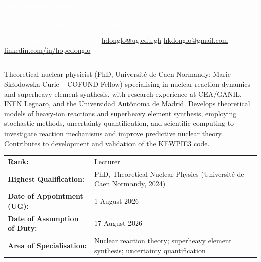 \documentclass[10pt,a4paper]{article}
\newcommand{\cvsection}[1]{%
  \par\vspace{8pt}%
  \noindent{\large\bfseries\textcolor{maincolor}{#1}}\par
  {\color{maincolor}\rule{\linewidth}{0.6pt}}%
  \vspace{4pt}%
}
\begin{document}

\noindent\colorbox{maincolor}{%
  \begin{minipage}{\dimexpr\linewidth-2\fboxsep\relax}
    \vspace{8pt}
    \begin{center}
      {\Huge\textbf{\textcolor{white}{Hope Donglo, PhD}}\par}
      \vspace{4pt}
      {\normalsize\textcolor{white}{%
        Lecturer, Department of Physics \enspace\textbar\enspace
        University of Ghana, Legon}\par}
      \vspace{5pt}
      \hypersetup{urlcolor=white}%
      {\footnotesize\textcolor{white}{%
        Legon, Accra, Ghana \enspace\textbar{}\,48\,10\,352 \enspace\textbar\enspace
        \href{mailto:hdonglo@ug.edu.gh}{hdonglo@ug.edu.gh}
        \enspace\textbar\enspace
        \href{mailto:hkdonglo@gmail.com}{hkdonglo@gmail.com}
        \enspace\textbar\enspace
        \href{https://linkedin.com/in/hopedonglo}{%
          linkedin.com/in/hopedonglo}%
      }}
    \end{center}
    \vspace{8pt}
  \end{minipage}%
}
\hypersetup{urlcolor=black}%
\vspace{6pt}

\cvsection{Professional Profile}

{\footnotesize
Theoretical nuclear physicist (PhD, Universit\'{e} de Caen Normandy;
Marie Sk\l{}odowska-Curie -- COFUND Fellow) specialising in nuclear
reaction dynamics and superheavy element synthesis, with research
experience at CEA/GANIL, INFN Legnaro, and the Universidad Aut\'{o}noma
de Madrid. Develops theoretical models of heavy-ion reactions and
superheavy element synthesis, employing stochastic methods, uncertainty
quantification, and scientific computing to investigate reaction
mechanisms and improve predictive nuclear theory. Contributes to
development and validation of the KEWPIE3 code.
}

\vspace{4pt}
{\footnotesize
\begin{tabular}{@{}p{4.6cm}p{10.5cm}@{}}
\textbf{Rank:} & Lecturer \\
\textbf{Highest Qualification:} & PhD, Theoretical Nuclear Physics (Universit\'{e} de Caen Normandy, 2024) \\
\textbf{Date of Appointment (UG):} & 1 August 2026 \\
\textbf{Date of Assumption of Duty:} & 17 August 2026 \\
\textbf{Area of Specialisation:} & Nuclear reaction theory; superheavy element synthesis; uncertainty quantification \\
\end{tabular}
}
\end{document}
